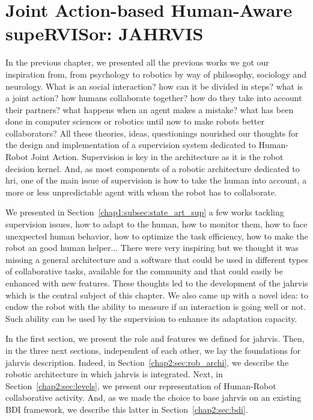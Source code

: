 \documentclass[a4paper,11pt,twoside]{StyleThese}
\begin{document}
\setcounter{chapter}{1} %
\dominitoc
\faketableofcontents
\fi

\chapter{Joint Action-based Human-Aware supeRVISor: JAHRVIS}
\label{chapter:chap2}
\minitoc

In the previous chapter, we presented all the previous works we got our inspiration from, from psychology to robotics by way of philosophy, sociology and neurology. What is an social interaction? how can it be divided in steps? what is a joint action? how humans collaborate together? how do they take into account their partners? what happens when an agent makes a mistake? what has been done in computer sciences or robotics until now to make robots better collaborators? All these theories, ideas, questionings nourished our thoughts for the design and implementation of a supervision system dedicated to Human-Robot Joint Action. Supervision is key in the architecture as it is the robot decision kernel. And, as most components of a robotic architecture dedicated to \acrshort{hri}, one of the main issue of supervision is how to take the human into account, a more or less unpredictable agent with whom the robot has to collaborate. 

We presented in Section~\ref{chap1:subsec:state_art_sup} a few works tackling supervision issues, \ie how to adapt to the human, how to monitor them, how to face unexpected human behavior, how to optimize the task efficiency, how to make the robot an good human helper... There were very inspiring but we thought it was missing a general architecture and a software that could be used in different types of collaborative tasks, available for the community and that could easily be enhanced with new features. These thoughts led to the development of the \acrfull{jahrvis} which is the central subject of this chapter. We also came up with a novel idea: to endow the robot with the ability to measure if an interaction is going well or not. Such ability can be used by the supervision to enhance its adaptation capacity.

In the first section, we present the role and features we defined for \acrshort{jahrvis}. Then, in the three next sections, independent of each other, we lay the foundations for \acrshort{jahrvis} description. Indeed, in Section~\ref{chap2:sec:rob_archi}, we describe the robotic architecture in which \acrshort{jahrvis} is integrated. Next, in Section~\ref{chap2:sec:levels}, we present our representation of Human-Robot collaborative activity. And, as we made the choice to base \acrshort{jahrvis} on an existing BDI framework, we describe this latter in Section~\ref{chap2:sec:bdi}. 
\end{document}
